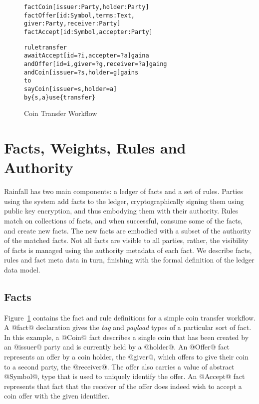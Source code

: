 
\clearpage{}


\begin{figure}
\begin{small}
\begin{alltt}
fact  Coin   [issuer: Party, holder: Party]
fact  Offer  [id: Symbol,   terms: Text,
              giver: Party, receiver: Party ]
fact  Accept [id: Symbol,   accepter: Party]

rule  transfer
await Accept [id = ?i, accepter = ?a]  gain a
  and Offer  [id = i,  giver = ?g, receiver = ?a] gain g
  and Coin   [issuer = ?s, holder = g] gain s
to
  say Coin   [issuer = s, holder = a]
   by \{s, a\} use \{transfer\}
\end{alltt}
\end{small}
\caption{Coin Transfer Workflow}
\label{f:CoinTransfer}
\end{figure}


\section{Facts, Weights, Rules and Authority}
\label{s:FactsWeights}
Rainfall has two main components: a ledger of facts and a set of rules. Parties using the system add facts to the ledger, cryptographically signing them using public key encryption, and thus embodying them with their authority. Rules match on collections of facts, and when successful, consume some of the facts, and create new facts. The new facts are embodied with a subset of the authority of the matched facts. Not all facts are visible to all parties, rather, the visibility of facts is managed using the authority metadata of each fact. We describe facts, rules and fact meta data in turn, finishing with the formal definition of the ledger data model.


\subsection{Facts}
\label{s:Facts}
Figure~\ref{f:CoinTransfer} contains the fact and rule definitions for a simple coin transfer workflow. A @fact@ declaration gives the \emph{tag} and \emph{payload} types of a particular sort of fact. In this example, a @Coin@ fact describes a single coin that has been created by an @issuer@ party and is currently held by a @holder@. An @Offer@ fact represents an offer by a coin holder, the @giver@, which offers to give their coin to a second party, the @receiver@. The offer also carries a value of abstract @Symbol@, type that is used to uniquely identify the offer. An @Accept@ fact represents that fact that the receiver of the offer does indeed wish to accept a coin offer with the given identifier.

